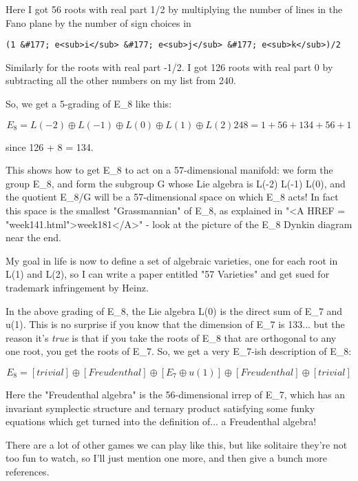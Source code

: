 Here I got 56 roots with real part 1/2 by multiplying the number of lines
in the Fano plane by the number of sign choices in

\begin{verbatim}
(1 &#177; e<sub>i</sub> &#177; e<sub>j</sub> &#177; e<sub>k</sub>)/2
\end{verbatim}
    
Similarly for the roots with real part -1/2.  I got 126 roots with real
part 0 by subtracting all the other numbers on my list from 240.

So, we get a 5-grading of E_{8} like this:

$$
E_{8} =  L(-2) \oplus  L(-1) \oplus  L(0) \oplus  L(1) \oplus  L(2)
248 =   1   +  56   +  134  +  56  +  1
$$
    
since 126 + 8 = 134.   

This shows how to get E_{8} to act on
a 57-dimensional manifold: we form the group E_{8}, and form
the subgroup G whose Lie algebra is L(-2) \oplus  L(-1) \oplus  L(0), and
the quotient E_{8}/G will be a 57-dimensional space on which E_{8}
acts!   In fact this space is the smallest "Grassmannian" of
E_{8}, as explained in "<A HREF = "week141.html">week181</A>" 
- look at the picture of the E_{8} Dynkin diagram near the end.

My goal in life is now to define a set of
algebraic varieties, one for each root in L(1) and L(2), so I 
can write a paper entitled "57 Varieties" and get sued for trademark 
infringement by Heinz.

In the above grading of E_{8}, the Lie algebra L(0) is the direct sum of E_{7} 
and u(1).  This is no surprise if you know that the dimension of E_{7} is 133... 
but the reason it's \emph{true} is that if you take the roots of E_{8} that are
orthogonal to any one root, you get the roots of E_{7}.  So, we get a very
E_{7}-ish description of E_{8}:

$$
E_{8} =  [trivial] \oplus  [Freudenthal] \oplus  [E_{7} \oplus  u(1)] \oplus  [Freudenthal] \oplus  [trivial]
$$
    

Here the "Freudenthal algebra" is the 56-dimensional irrep
of E_{7}, which has an invariant symplectic structure and
ternary product satisfying some funky equations which get turned into
the definition of... a Freudenthal algebra!

There are a lot of other games we can play like this, but like solitaire
they're not too fun to watch, so I'll just mention one more, and then
give a bunch more references.

